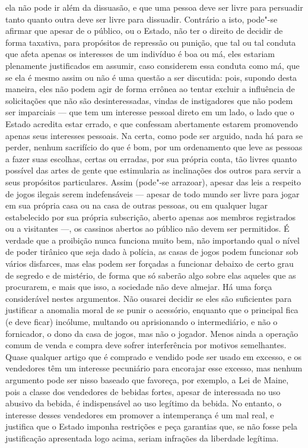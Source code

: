 ela não pode ir além da dissuasão, e que uma pessoa deve ser livre para
persuadir tanto quanto outra deve ser livre para dissuadir. Contrário a
isto, pode"-se afirmar que apesar de o público, ou o Estado, não ter o
direito de decidir de forma taxativa, para propósitos de repressão
ou punição, que tal ou tal conduta que afeta apenas os interesses de um
indivíduo é boa ou má, eles estariam plenamente justificados em
assumir, caso considerem essa conduta como má, que se ela é mesmo assim
ou não é uma questão a ser discutida: pois, supondo desta maneira, eles não
podem agir de forma errônea ao tentar excluir a influência de
solicitações que não são desinteressadas, vindas de instigadores que
não podem ser imparciais --- que tem um interesse pessoal direto em um
lado, o lado que o Estado acredita estar errado, e que confessam
abertamente estarem promovendo apenas seus interesses pessoais. Na
certa, como pode ser arguido, nada há para se perder, nenhum sacrifício
do que é bom, por um ordenamento que leve as pessoas a fazer suas
escolhas, certas ou erradas, por sua própria conta, tão livres quanto
possível das artes de gente que estimularia as inclinações dos outros
para servir a seus propósitos particulares. Assim (pode"-se arrazoar), apesar
das leis a respeito de jogos ilegais serem indefensáveis --- apesar
de todo mundo ser livre para jogar em sua própria casa ou na casa de
outras pessoas, ou em qualquer lugar estabelecido por sua própria
subscrição, aberto apenas aos membros registrados ou a visitantes ---,
os cassinos abertos ao público não devem ser permitidos. É verdade que
a proibição nunca funciona muito bem, não importando qual o nível de
poder tirânico que seja dado à polícia, as casas de jogos podem
funcionar sob vários disfarces, mas elas podem ser forçadas a
funcionar debaixo de certo grau de segredo e de mistério, de forma que
só saberão algo sobre elas aqueles que as procurarem, e mais que isso, a
sociedade não deve almejar. Há uma força considerável nestes
argumentos. Não ousarei decidir se eles são suficientes para justificar
a anomalia moral de se punir o acessório, enquanto que o principal fica
(e deve ficar) incólume, multando ou aprisionando o intermediário, e
não o fornicador, o dono da casa de jogos, mas não o jogador. Menos
ainda a operação comum de venda e compra deve sofrer interferência por
motivos semelhantes. Quase qualquer artigo que é comprado e vendido
pode ser usado em excesso, e os vendedores têm um interesse pecuniário
para encorajar esse excesso, mas nenhum argumento pode ser nisso
baseado que favoreça, por exemplo, a Lei de Maine, pois a classe dos
vendedores de bebidas fortes, apesar de interessada no uso abusivo da
bebida, é indispensável ao uso legítimo da bebida.
No entanto, o interesse desses vendedores em promover a intemperança é
um mal real, e justifica que o Estado imponha restrições e peça
garantias que, se não fosse pela justificação apresentada logo acima,
seriam infrações da liberdade legítima. 

